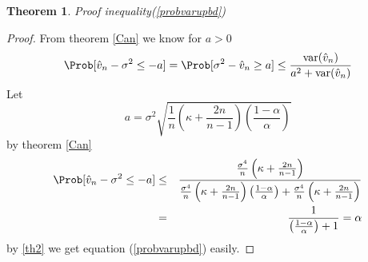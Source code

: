 \documentclass[12pt]{amsart}
\newtheorem{theorem}{Theorem}
\begin{document}
\begin{theorem}
Proof inequality(\ref{probvarupbd})
\end{theorem}
\begin{proof}From theorem \ref{Can} we know for $a>0$
$$\Prob[\hat{v}_n-\sigma^2\leq
-a]=\Prob[\sigma^2-\hat{v}_n\geq
a]\leq\frac{\text{var}(\hat{v}_n)}{a^2+\text{var}(\hat{v}_n)}$$Let
$$a=\sigma^2\sqrt{\frac{1}{n}\left(\kappa+\frac{2n}{n-1}\right)\left(\frac{1-\alpha}{\alpha}\right)}$$
by theorem \ref{Can}
\begin{eqnarray} \label{th2}\nonumber\Prob[\hat{v}_n-\sigma^2\leq
-a]&\leq&\frac{\frac{\sigma^4}{n}\left(\kappa+\frac{2n}{n-1}\right)}{\frac{\sigma^4}{n}\left(\kappa+\frac{2n}{n-1}\right)\left(\frac{1-\alpha}{\alpha}\right)+\frac{\sigma^4}{n}\left(\kappa+\frac{2n}{n-1}\right)}\\&
=&\frac{1}{\left(\frac{1-\alpha}{\alpha}\right)+1}=\alpha
\end{eqnarray}
by \eqref{th2} we get equation (\ref{probvarupbd}) easily.
\end{proof}
\end{document}

